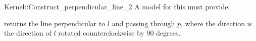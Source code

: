 \begin{ccRefFunctionObjectConcept}{Kernel::Construct_perpendicular_line_2}
A model for this must provide:


        {returns the line perpendicular to $l$ and passing through $p$,
         where the direction is the direction of $l$ rotated 
         counterclockwise by 90 degrees.}

\ccIsModel{}

\end{ccRefFunctionObjectConcept}
